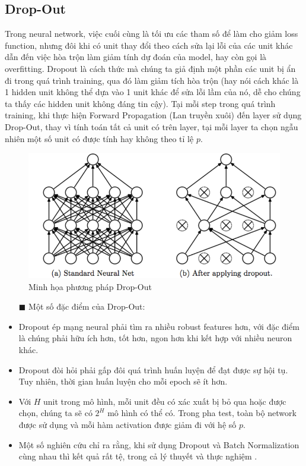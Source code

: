 \subsection{Drop-Out}
\label{ss:dropout}
Trong neural network, việc cuối cùng là tối ưu các tham số để làm cho giảm loss function, nhưng đôi khi có unit thay đổi theo cách sửa lại lỗi của các unit khác dẫn đến việc hòa trộn làm giảm tính dự đoán của model, hay còn gọi là overfitting. Dropout là cách thức mà chúng ta giả định một phần các unit bị ẩn đi trong quá trình training, qua đó làm giảm tích hòa trộn (hay nói cách khác là 1 hidden unit không thể dựa vào 1 unit khác để sửa lỗi lầm của nó, dễ cho chúng ta thấy các hidden unit không đáng tin cậy). Tại mỗi step trong quá trình training, khi thực hiện Forward Propagation (Lan truyền xuôi) đến layer sử dụng Drop-Out, thay vì tính toán tất cả unit có trên layer, tại mỗi layer ta chọn ngẫu nhiên một số unit có được tính hay không theo tỉ lệ $p$.

\FloatBarrier
\begin{figure}[htp]
\begin{center}
\includegraphics[scale=0.5]{chap2/c2_figs/drop_out.png}
\end{center}
\caption{Minh họa phương pháp Drop-Out}
\label{fig:dropout}
\end{figure}
\FloatBarrier

\begin{itemize}
\item[$\blacksquare$] Một số đặc điểm của Drop-Out:
\item Dropout ép mạng neural phải tìm ra nhiều robust features hơn, với đặc điểm là chúng phải hữu ích hơn, tốt hơn, ngon hơn khi kết hợp với nhiều neuron khác.
\item Dropout đòi hỏi phải gấp đôi quá trình huấn luyện để đạt được sự hội tụ. Tuy nhiên, thời gian huấn luyện cho mỗi epoch sẽ ít hơn.
\item Với $H$ unit trong mô hình, mỗi unit đều có xác xuất bị bỏ qua hoặc được chọn, chúng ta sẽ có $2^{H}$ mô hình có thể có. Trong pha test, toàn bộ network được sử dụng và mỗi hàm activation được giảm đi với hệ số $p$.
\item Một số nghiên cứu chỉ ra rằng, khi sử dụng Dropout và Batch Normalization cùng nhau thì kết quả rất tệ, trong cả lý thuyết và thực nghiệm \cite{li2019understanding}.
\end{itemize}

